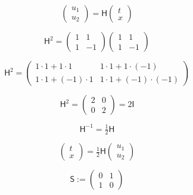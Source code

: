 \documentclass[12pt]{article}
\begin{document}
\begin{equation}
\begin{pmatrix}u_1\\[2pt]u_2\end{pmatrix}=\mathsf{H}\begin{pmatrix}t\\[2pt]x\end{pmatrix}
\end{equation}

\begin{equation}
\mathsf{H}^2=\begin{pmatrix}1&1\\[2pt]1&-1\end{pmatrix}\begin{pmatrix}1&1\\[2pt]1&-1\end{pmatrix}
\end{equation}

\begin{equation}
\mathsf{H}^2=\begin{pmatrix}1\cdot1+1\cdot1&1\cdot1+1\cdot(-1)\\[2pt]1\cdot1+(-1)\cdot1&1\cdot1+(-1)\cdot(-1)\end{pmatrix}
\end{equation}

\begin{equation}
\mathsf{H}^2=\begin{pmatrix}2&0\\[2pt]0&2\end{pmatrix}=2\mathsf{I}
\end{equation}

\begin{equation}
\mathsf{H}^{-1}=\tfrac{1}{2}\mathsf{H}
\end{equation}

\begin{equation}
\begin{pmatrix}t\\[2pt]x\end{pmatrix}=\tfrac{1}{2}\mathsf{H}\begin{pmatrix}u_1\\[2pt]u_2\end{pmatrix}
\end{equation}

\begin{equation}
\mathsf{S}:=\begin{pmatrix}0&1\\[2pt]1&0\end{pmatrix}
\end{equation}
\end{document}
